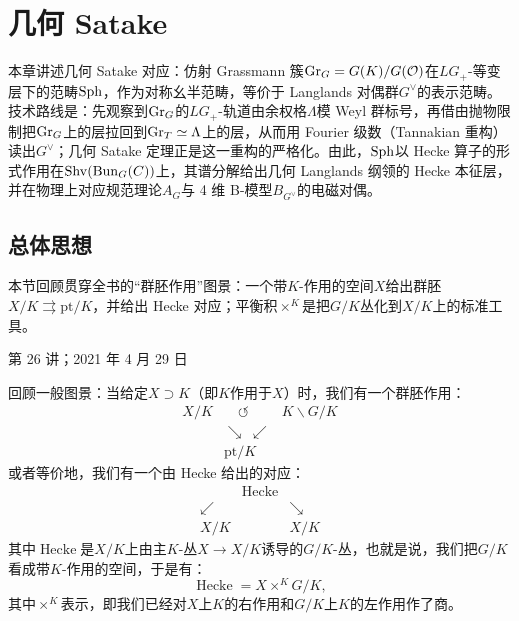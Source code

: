 \chapter{几何 Satake}\label{ch:11}

\begin{keytakeaways}
本章讲述几何 Satake 对应：仿射 Grassmann 簇$\mathrm{Gr}_G=G(K)/G(\mathcal{O})$在$LG_+$-等变层下的范畴$\mathrm{Sph}$，作为对称幺半范畴，等价于 Langlands 对偶群$G^{\vee}$的表示范畴。技术路线是：先观察到$\mathrm{Gr}_G$的$LG_+$-轨道由余权格$\Lambda$模 Weyl 群标号，再借由抛物限制把$\mathrm{Gr}_G$上的层拉回到$\mathrm{Gr}_T\simeq\Lambda$上的层，从而用 Fourier 级数（Tannakian 重构）读出$G^{\vee}$；几何 Satake 定理正是这一重构的严格化。由此，$\mathrm{Sph}$以 Hecke 算子的形式作用在$\mathrm{Shv}(\mathrm{Bun}_G(C))$上，其谱分解给出几何 Langlands 纲领的 Hecke 本征层，并在物理上对应规范理论$A_G$与 4 维 B-模型$B_{G^{\vee}}$的电磁对偶。
\end{keytakeaways}

\section{总体思想}\label{sec:11-1}

\begin{sectionkey}
本节回顾贯穿全书的“群胚作用”图景：一个带$K$-作用的空间$X$给出群胚$X/K\rightrightarrows \mathrm{pt}/K$，并给出 Hecke 对应；平衡积$\times^K$是把$G/K$丛化到$X/K$上的标准工具。
\end{sectionkey}

\begin{flushright}\small 第 26 讲；2021 年 4 月 29 日\end{flushright}

回顾一般图景：当给定$X\supset K$（即$K$作用于$X$）时，我们有一个群胚作用：
\begin{equation}\tag{11.1}
\begin{array}{ccc}
X/K & \quad\circlearrowleft\quad & K\backslash G/K\\[2pt]
 & \searrow\ \swarrow & \\[2pt]
 & \mathrm{pt}/K &
\end{array}
\end{equation}
或者等价地，我们有一个由 Hecke 给出的对应：
\begin{equation}\tag{11.2}
\begin{array}{ccc}
 & \operatorname{Hecke} & \\
 \swarrow & & \searrow\\
 X/K & & X/K
\end{array}
\end{equation}
其中$\operatorname{Hecke}$是$X/K$上由主$K$-丛$X\to X/K$诱导的$G/K$-丛，也就是说，我们把$G/K$看成带$K$-作用的空间，于是有：
\begin{equation}\tag{11.3}
\operatorname{Hecke}=X\times^{K}G/K,
\end{equation}
其中$\times^{K}$表示，即我们已经对$X$上$K$的右作用和$G/K$上$K$的左作用作了商。

